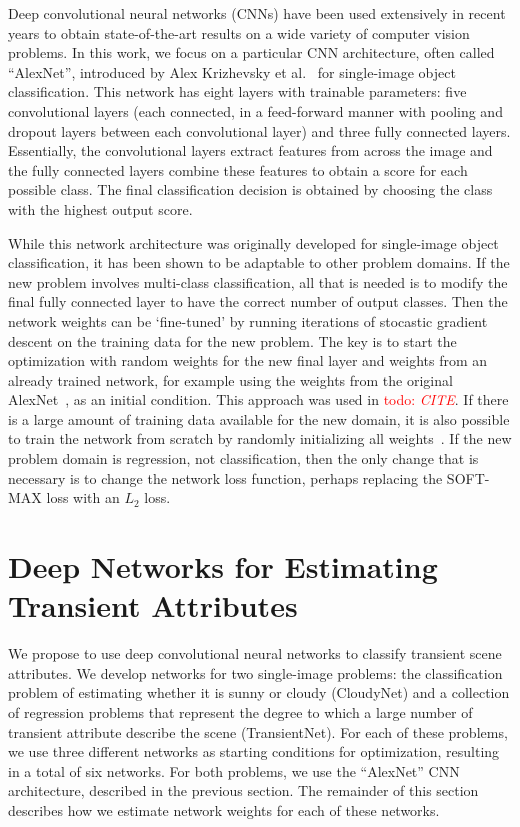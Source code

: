 \documentclass{article}
\newcommand{\todo}[1]{\textcolor{red}{todo: {\em #1}}}
\begin{document}
Deep convolutional neural networks (CNNs) have been used extensively
in recent years to obtain state-of-the-art results on a wide variety
of computer vision problems.  In this work, we focus on a particular
CNN architecture, often called ``AlexNet'', introduced by Alex
Krizhevsky et al.~\cite{caffenetnips12} for single-image object
classification. This network has eight layers with trainable
parameters: five convolutional layers (each connected, in a
feed-forward manner with pooling and dropout layers between each
convolutional layer) and three fully connected layers. Essentially,
the convolutional layers extract features from across the image and
the fully connected layers combine these features to obtain a score
for each possible class. The final classification decision is obtained
by choosing the class with the highest output score.

While this network architecture was originally developed for
single-image object classification, it has been shown to be adaptable
to other problem domains. If the new problem involves multi-class
classification, all that is needed is to modify the final fully
connected layer to have the correct number of output classes. Then the
network weights can be `fine-tuned' by running iterations of stocastic
gradient descent on the training data for the new problem.  The key is
to start the optimization with random weights for the new final layer
and weights from an already trained network, for example using the
weights from the original AlexNet~\cite{caffenetnips12}, as an initial
condition. This approach was used in \todo{CITE}. If there is a large
amount of training data available for the new domain, it is also
possible to train the network from scratch by randomly initializing
all weights~\cite{zhou2014places}.  If the new problem domain is
regression, not classification, then the only change that is necessary
is to change the network loss function, perhaps replacing the SOFT-MAX
loss with an $L_2$ loss.

\section{Deep Networks for Estimating Transient Attributes}

We propose to use deep convolutional neural networks to classify
transient scene attributes. We develop networks for two single-image
problems: the classification problem of estimating whether it is sunny
or cloudy (CloudyNet) and a collection of regression problems that
represent the degree to which a large number of transient attribute
describe the scene (TransientNet).  For each of these problems, we
use three different networks as starting conditions for optimization,
resulting in a total of six networks.  For both problems, we use the
``AlexNet'' CNN architecture, described in the previous section.  The
remainder of this section describes how we estimate network weights
for each of these networks.
\end{document}
